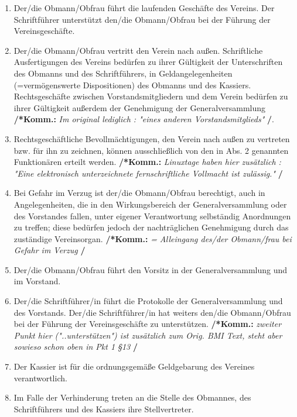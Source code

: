 \documentclass[a4paper,12pt]{article}
\newcommand{\comment}[1]{{\bf /*Komm.:} \textit{#1} {\bf */}}
\begin{document}
\begin{enumerate}

\item Der/die Obmann/Obfrau führt die laufenden Geschäfte des Vereins. Der Schriftführer unterstützt den/die Obmann/Obfrau bei der Führung der Vereinsgeschäfte.

\item Der/die Obmann/Obfrau vertritt den Verein nach außen.
Schriftliche Ausfertigungen des Vereins bedürfen zu ihrer Gültigkeit der Unterschriften des Obmanns und des Schriftführers, in Geldangelegenheiten (=vermögenswerte Dispositionen) des Obmanns und des Kassiers.
Rechtsgeschäfte zwischen Vorstandsmitgliedern und dem Verein bedürfen zu ihrer Gültigkeit außerdem der Genehmigung der Generalversammlung \comment{Im original lediglich : "eines anderen Vorstandsmitglieds"}.

\item Rechtsgeschäftliche Bevollmächtigungen, den Verein nach außen zu vertreten bzw. für ihn zu zeichnen, können ausschließlich von den in Abs. 2 genannten Funktionären erteilt werden.
\comment{Linuxtage haben hier zusätzlich : "Eine elektronisch unterzeichnete fernschriftliche Vollmacht ist zulässig." }

\item Bei Gefahr im Verzug ist der/die Obmann/Obfrau berechtigt, auch in Angelegenheiten, die in den Wirkungsbereich der Generalversammlung oder des Vorstandes fallen, unter eigener Verantwortung selbständig Anordnungen zu treffen; diese bedürfen jedoch der nachträglichen Genehmigung durch das zuständige Vereinsorgan.
\comment{ = Alleingang des/der Obmann/frau bei Gefahr im Verzug}

\item Der/die Obmann/Obfrau führt den Vorsitz in der Generalversammlung und im Vorstand.

\item 
Der/die Schriftführer/in führt die Protokolle der Generalversammlung und des Vorstands.
Der/die Schriftführer/in hat weiters den/die Obmann/Obfrau bei der Führung der Vereinsgeschäfte zu unterstützen.
\comment{zweiter Punkt hier ("..unterstützen") ist zusätzlich zum Orig. BMI Text, steht aber sowieso schon oben in Pkt 1 §13}

\item Der Kassier ist für die ordnungsgemäße Geldgebarung des Vereines verantwortlich.

\item Im Falle der Verhinderung treten an die Stelle des Obmannes, des Schriftführers und des Kassiers ihre Stellvertreter.

\end{enumerate}
\end{document}

